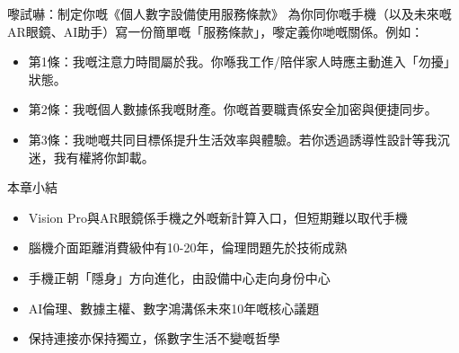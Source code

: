 \begin{tcbpractice}{嚟試嚇：制定你嘅《個人數字設備使用服務條款》}
為你同你嘅手機（以及未來嘅AR眼鏡、AI助手）寫一份簡單嘅「服務條款」，嚟定義你哋嘅關係。例如：

\begin{itemize}
  \item 第1條：我嘅注意力時間屬於我。你喺我工作/陪伴家人時應主動進入「勿擾」狀態。
  \item 第2條：我嘅個人數據係我嘅財產。你嘅首要職責係安全加密與便捷同步。
  \item 第3條：我哋嘅共同目標係提升生活效率與體驗。若你透過誘導性設計等我沉迷，我有權將你卸載。
\end{itemize}

\end{tcbpractice}

\begin{tcbsummary}{本章小結}
\begin{itemize}
  \item Vision Pro與AR眼鏡係手機之外嘅新計算入口，但短期難以取代手機
  \item 腦機介面距離消費級仲有10-20年，倫理問題先於技術成熟
  \item 手機正朝「隱身」方向進化，由設備中心走向身份中心
  \item AI倫理、數據主權、數字鴻溝係未來10年嘅核心議題
  \item 保持連接亦保持獨立，係數字生活不變嘅哲學
\end{itemize}

\end{tcbsummary}
